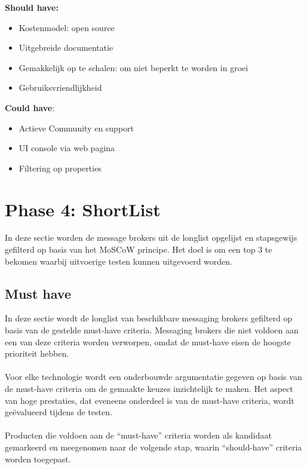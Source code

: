 \textbf{Should have:}
\begin{itemize}
  \item Kostenmodel: open source 
  \item Uitgebreide documentatie
  \item Gemakkelijk op te schalen: om niet beperkt te worden in groei
  \item Gebruiksvriendlijkheid
\end{itemize}

\textbf{Could have}:
\begin{itemize}
  \item Actieve Community en support
  \item UI console via web pagina 
  \item Filtering op properties
\end{itemize}

\newpage
\section{Phase 4: ShortList}
In deze sectie worden de message brokers uit de longlist opgelijst en stapsgewijs gefilterd op basis van het MoSCoW principe.
Het doel is om een top 3 te bekomen waarbij uitvoerige testen kunnen uitgevoerd worden.

\subsection{Must have}
In deze sectie wordt de longlist van beschikbare messaging brokers gefilterd op basis van de gestelde must-have criteria. 
Messaging brokers die niet voldoen aan een van deze criteria worden verworpen, omdat de must-have eisen de hoogste prioriteit hebben.
\\\\
Voor elke technologie wordt een onderbouwde argumentatie gegeven op basis van de must-have criteria om de gemaakte keuzes inzichtelijk te maken. 
Het aspect van hoge prestaties, dat eveneens onderdeel is van de must-have criteria, wordt geëvalueerd tijdens de testen.
\\\\
Producten die voldoen aan de ``must-have'' criteria worden als kandidaat gemarkeerd en meegenomen naar de volgende stap, waarin ``should-have'' criteria worden toegepast.
 
